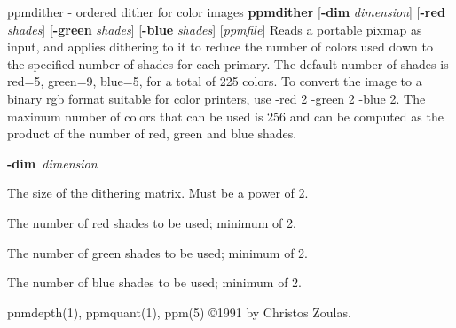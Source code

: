 ppmdither - ordered dither for color images
{\bf ppmdither}
{\rm [}{\bf -dim}
{\it dimension}{\rm ]}
{\rm [}{\bf -red}
{\it shades}{\rm ]}
{\rm [}{\bf -green}
{\it shades}{\rm ]}
{\rm [}{\bf -blue}
{\it shades}{\rm ]}
{\rm [}{\it ppmfile}{\rm ]}
Reads a portable pixmap as input, and applies dithering to it to reduce
the number of colors used down to the specified number of shades for
each primary.
The default number of shades is red=5, green=9, blue=5, for
a total of 225 colors.
To convert the image to a binary rgb format 
suitable for color printers, use -red 2 -green 2 -blue 2.
The maximum
number of colors that can be used is 256 and can be computed as the 
product of the number of red, green and blue shades.
\begin{TPlist}{{\bf -dim}{\it \ dimension}
}
\item[{{\bf -dim}{\it \ dimension}
}]
The size of the dithering matrix.
Must be a power of 2.
\item[{{\bf -red}{\it \ shades}
}]
The number of red shades to be used; minimum of 2.
\item[{{\bf -green}{\it \ shades}
}]
The number of green shades to be used; minimum of 2.
\item[{{\bf -blue}{\it \ shades}
}]
The number of blue shades to be used; minimum of 2.
\end{TPlist}

pnmdepth(1), ppmquant(1), ppm(5)
\copyright 1991 by Christos Zoulas.
%
 
%

\newpage
%

